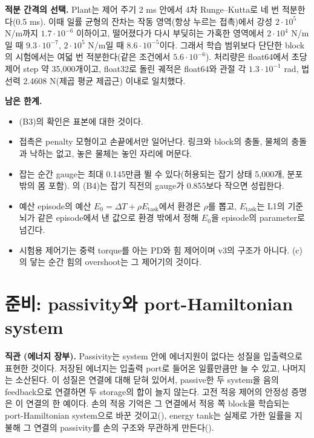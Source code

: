 \documentclass[11pt]{article}\usepackage[margin=1in]{geometry}\usepackage{amsmath,amssymb,amsthm,mathtools}\usepackage{graphicx}\graphicspath{{figures/}{../figures/}{figs/}{./}}\usepackage{enumitem}\usepackage{hyperref}\usepackage{cleveref}\usepackage{tikz}\usetikzlibrary{arrows.meta,positioning,calc,shapes.geometric}\usepackage{float}\usepackage{rotating}\usepackage[most]{tcolorbox}\usepackage{kotex}\usepackage{booktabs}\usepackage{longtable}\emergencystretch=1.6em\tolerance=2000 \crefname{assumption}{Assumption}{Assumptions}\Crefname{assumption}{Assumption}{Assumptions}\crefname{definition}{Definition}{Definitions}\Crefname{definition}{Definition}{Definitions}\crefname{proposition}{Proposition}{Propositions}\Crefname{proposition}{Proposition}{Propositions}\crefname{fact}{Fact}{Facts}\Crefname{fact}{Fact}{Facts} \newtheorem{assumption}{Assumption}\newtheorem{definition}{Definition}\newtheorem{lemma}{Lemma}\newtheorem{proposition}{Proposition}\newtheorem{theorem}{Theorem}\newtheorem{corollary}{Corollary}\newtheorem{fact}{Fact}\theoremstyle{remark}\newtheorem{remark}{Remark} \newcommand{\R}{\mathbb{R}}\newcommand{\xb}{\bar x}\newcommand{\Ab}{\bar A}\newcommand{\By}{\bar B_y}\newcommand{\U}{\mathcal U}\newcommand{\Z}{\mathcal Z}
\begin{document}
\textbf{적분 간격의 선택.} Plant는 제어 주기 2 ms 안에서 4차 Runge--Kutta로 네 번 적분한다(0.5 ms). 이때 일률 균형의 잔차는 작동 영역(항상 누르는 접촉)에서 강성 $2\cdot10^5$ N/m까지 $1.7\cdot10^{-6}$ 이하이고, 떨어졌다가 다시 부딪히는 가혹한 영역에서 $2\cdot10^4$ N/m일 때 $9.3\cdot10^{-7}$, $2\cdot10^5$ N/m일 때 $8.6\cdot10^{-5}$이다. 그래서 학습 범위보다 단단한 block의 시험에서는 여덟 번 적분한다(같은 조건에서 $5.6\cdot10^{-6}$). 처리량은 float64에서 초당 제어 step 약 35{,}000개이고, float32로 돌린 궤적은 float64와 관절 각 $1.3\cdot10^{-1}$ rad, 법선력 2.4608 N(제곱 평균 제곱근) 이내로 일치했다.

\textbf{남은 한계.}
\begin{itemize}
\item (B3)의 확인은 표본에 대한 것이다.
\item 접촉은 penalty 모형이고 손끝에서만 일어난다. 링크와 block의 충돌, 물체의 충돌과 낙하는 없고, 놓은 물체는 놓인 자리에 머문다.
\item 잡는 순간 gauge는 최대 0.145만큼 뛸 수 있다(허용되는 잡기 상태 5{,}000개, 분포 밖의 몸 포함). 의 (B4)는 잡기 직전의 gauge가 0.855보다 작으면 성립한다.
\item 예산 episode의 예산 $E_0=\Delta T+\rho E_{\mathrm{task}}$에서 환경은 $\rho$를 뽑고, $E_{\mathrm{task}}$는 L1의 기준 뇌가 같은 episode에서 낸 값으로 환경 밖에서 정해 $E_0$을 episode의 parameter로 넘긴다.
\item 시험용 제어기는 중력 torque를 아는 PD와 힘 제어이며 v3의 구조가 아니다. (c)의 닿는 순간 힘의 overshoot는 그 제어기의 것이다.
\end{itemize}

\section{준비: passivity와 port-Hamiltonian system}
\label{sec:prelim}

\textbf{직관 (에너지 장부).} Passivity는 system 안에 에너지원이 없다는 성질을 입출력으로 표현한 것이다. 저장된 에너지는 입출력 port로 들어온 일률만큼만 늘 수 있고, 나머지는 소산된다. 이 성질은 연결에 대해 닫혀 있어서, passive한 두 system을 음의 feedback으로 연결하면 두 storage의 합이 늘지 않는다. 고전 적응 제어의 안정성 증명은 이 연결의 한 예이다. 손의 적응 기억은 그 연결에서 적응 쪽 block을 학습되는 port-Hamiltonian system으로 바꾼 것이고(), energy tank는 실제로 가한 일률을 지불해 그 연결의 passivity를 손의 구조와 무관하게 만든다().
\end{document}
